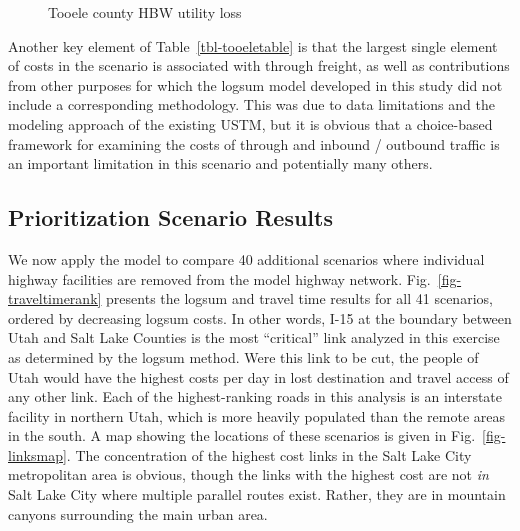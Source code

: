 \documentclass[]{ascelike-new}
\begin{document}
\begin{figure}


\caption{\label{fig-tooelemap}Tooele county HBW utility loss}

\end{figure}%

Another key element of Table~\ref{tbl-tooeletable} is that the largest
single element of costs in the scenario is associated with through
freight, as well as contributions from other purposes for which the
logsum model developed in this study did not include a corresponding
methodology. This was due to data limitations and the modeling approach
of the existing USTM, but it is obvious that a choice-based framework
for examining the costs of through and inbound / outbound traffic is an
important limitation in this scenario and potentially many others.

\subsection{Prioritization Scenario
Results}\label{prioritization-scenario-results}

We now apply the model to compare 40 additional scenarios where
individual highway facilities are removed from the model highway
network. Fig.~\ref{fig-traveltimerank} presents the logsum and travel
time results for all 41 scenarios, ordered by decreasing logsum costs.
In other words, I-15 at the boundary between Utah and Salt Lake Counties
is the most ``critical'' link analyzed in this exercise as determined by
the logsum method. Were this link to be cut, the people of Utah would
have the highest costs per day in lost destination and travel access of
any other link. Each of the highest-ranking roads in this analysis is an
interstate facility in northern Utah, which is more heavily populated
than the remote areas in the south. A map showing the locations of these
scenarios is given in Fig.~\ref{fig-linksmap}. The concentration of the
highest cost links in the Salt Lake City metropolitan area is obvious,
though the links with the highest cost are not \emph{in} Salt Lake City
where multiple parallel routes exist. Rather, they are in mountain
canyons surrounding the main urban area.
\end{document}
